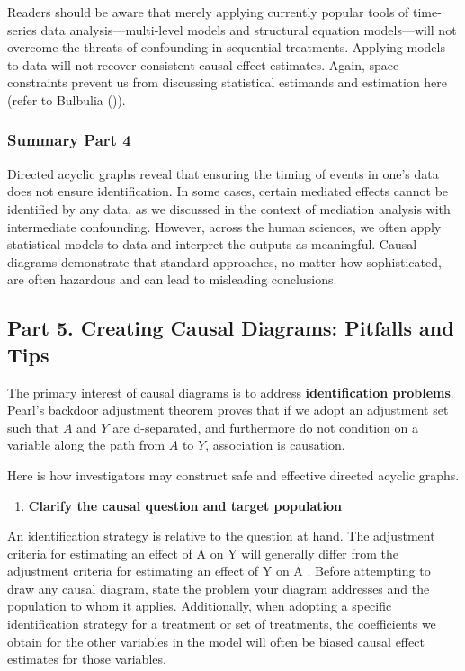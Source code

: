\documentclass[
  single column]{article}
\providecommand{\tightlist}{%
  \setlength{\itemsep}{0pt}\setlength{\parskip}{0pt}}\usepackage{longtable,booktabs,array}
\begin{document}
Readers should be aware that merely applying currently popular tools of
time-series data analysis---multi-level models and structural equation
models---will not overcome the threats of confounding in sequential
treatments. Applying models to data will not recover consistent causal
effect estimates. Again, space constraints prevent us from discussing
statistical estimands and estimation here (refer to Bulbulia
()).

\subsubsection{Summary Part 4}\label{summary-part-4}

Directed acyclic graphs reveal that ensuring the timing of events in
one's data does not ensure identification. In some cases, certain
mediated effects cannot be identified by any data, as we discussed in
the context of mediation analysis with intermediate confounding.
However, across the human sciences, we often apply statistical models to
data and interpret the outputs as meaningful. Causal diagrams
demonstrate that standard approaches, no matter how sophisticated, are
often hazardous and can lead to misleading conclusions.

\subsection{Part 5. Creating Causal Diagrams: Pitfalls and
Tips}\label{id-sec-5}

The primary interest of causal diagrams is to address
\textbf{identification problems}. Pearl's backdoor adjustment theorem
proves that if we adopt an adjustment set such that \(A\) and \(Y\) are
d-separated, and furthermore do not condition on a variable along the
path from \(A\) to \(Y\), association is causation.

Here is how investigators may construct safe and effective directed
acyclic graphs.

\begin{enumerate}
\def\labelenumi{\arabic{enumi}.}
\tightlist
\item
  \textbf{Clarify the causal question and target population}
\end{enumerate}

An identification strategy is relative to the question at hand. The
adjustment criteria for estimating an effect of A on Y will generally
differ from the adjustment criteria for estimating an effect of Y on A .
Before attempting to draw any causal diagram, state the problem your
diagram addresses and the population to whom it applies. Additionally,
when adopting a specific identification strategy for a treatment or set
of treatments, the coefficients we obtain for the other variables in the
model will often be biased causal effect estimates for those variables.
\end{document}
